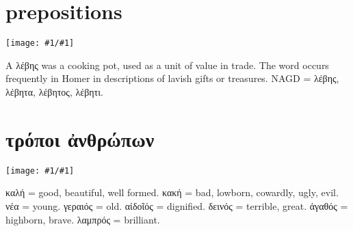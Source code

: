 \documentclass[12pt,openany]{book}
\newenvironment{notes}{\vfill\scriptsize\begin{flushright}}{\end{flushright}}
\newcommand{\fig}[1]{\begin{center}\texttt{[image: \#1/\#1]}\end{center}}
\begin{document}

\chapter{prepositions}

\fig{prepositions}

\begin{notes}
A λέβης was a cooking pot, used as a unit of value in trade. The word occurs frequently in Homer in descriptions
of lavish gifts or treasures. NAGD = λέβης, λέβητα, λέβητος, λέβητι.
\end{notes}


\chapter{τρόποι ἀνθρώπων}

\fig{character}

\begin{notes}
καλή = good, beautiful, well formed. κακή = bad, lowborn, cowardly, ugly, evil. νέα = young.
γεραιός = old. αἰδοῖός = dignified. δεινός = terrible, great. ἀγαθός = highborn, brave.
λαμπρός = brilliant.
\end{notes}
\end{document}

